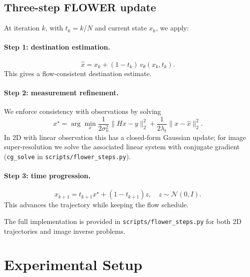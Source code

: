 \documentclass[11pt]{article}
\begin{document}
\subsection{Three-step FLOWER update}
At iteration $k$, with $t_k = k/N$ and current state $x_k$, we apply:

\paragraph{Step 1: destination estimation.}
\begin{equation}
    \hat{x} = x_k + (1-t_k)\,v_{\theta}(x_k,t_k).
\end{equation}
This gives a flow-consistent destination estimate.

\paragraph{Step 2: measurement refinement.}
We enforce consistency with observations by solving
\begin{equation}
    x^\star = \arg\min_x \frac{1}{2\sigma_n^2}\|Hx-y\|_2^2 + \frac{1}{2\lambda_t}\|x-\hat{x}\|_2^2.
\end{equation}
In 2D with linear observation this has a closed-form Gaussian update; for image super-resolution we solve the associated linear system with conjugate gradient (\texttt{cg\_solve} in \texttt{scripts/flower\_steps.py}).

\paragraph{Step 3: time progression.}
\begin{equation}
    x_{k+1} = t_{k+1}x^\star + (1-t_{k+1})z,\quad z\sim\mathcal{N}(0,I).
\end{equation}
This advances the trajectory while keeping the flow schedule.

\medskip
\noindent
The full implementation is provided in \texttt{scripts/flower\_steps.py} for both 2D trajectories and image inverse problems.

\section{Experimental Setup}
\end{document}

